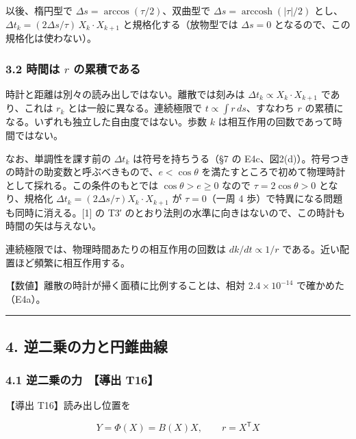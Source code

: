 \documentclass[
  a4paper,
]{ltjsarticle}
\begin{document}
以後、楕円型で \(\Delta s=\arccos(\tau/2)\)、双曲型で
\(\Delta s=\operatorname{arccosh}(|\tau|/2)\)
とし、\(\Delta t_k=(2\Delta s/\tau)\,X_k\cdot X_{k+1}\)
と規格化する（放物型では \(\Delta s=0\)
となるので、この規格化は使わない）。

\subsubsection{\texorpdfstring{3.2 時間は \(r\)
の累積である}{3.2 時間は r の累積である}}\label{ux6642ux9593ux306f-r-ux306eux7d2fux7a4dux3067ux3042ux308b}

時計と距離は別々の読み出しではない。離散では刻みは
\(\Delta t_k\propto X_k\cdot X_{k+1}\) であり、これは \(r_k\)
とは一般に異なる。連続極限で \(t\propto\int r\,ds\)、すなわち \(r\)
の累積になる。いずれも独立した自由度ではない。歩数 \(k\)
は相互作用の回数であって時間ではない。

なお、単調性を課す前の \(\Delta t_k\) は符号を持ちうる（§7 の
E4c、図2(d)）。符号つきの時計の助変数と呼ぶべきもので、\(e<\cos\theta\)
を満たすところで初めて物理時計として採れる。この条件のもとでは
\(\cos\theta>e\ge0\) なので \(\tau=2\cos\theta>0\) となり、規格化
\(\Delta t_k=(2\Delta s/\tau)X_k\cdot X_{k+1}\) が \(\tau=0\)（一周 4
歩）で特異になる問題も同時に消える。{[}1{]} の T3′
のとおり法則の水準に向きはないので、この時計も時間の矢は与えない。

連続極限では、物理時間あたりの相互作用の回数は \(dk/dt\propto1/r\)
である。近い配置ほど頻繁に相互作用する。

【数値】離散の時計が掃く面積に比例することは、相対 \(2.4\times10^{-14}\)
で確かめた（E4a）。

\begin{center}\rule{0.5\linewidth}{0.5pt}\end{center}

\subsection{4.
逆二乗の力と円錐曲線}\label{ux9006ux4e8cux4e57ux306eux529bux3068ux5186ux9310ux66f2ux7dda}

\subsubsection{4.1 逆二乗の力　【導出
T16】}\label{ux9006ux4e8cux4e57ux306eux529b-ux5c0eux51fa-t16}

【導出 T16】読み出し位置を

\[
Y=\Phi(X)=B(X)X,\qquad r=X^{\mathsf T}X
\]
\end{document}
